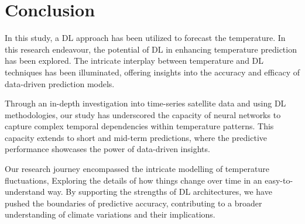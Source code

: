 \documentclass[sn-mathphys,Numbered]{sn-jnl}
\theoremstyle{thmstyleone}
\theoremstyle{thmstyletwo}
\theoremstyle{thmstylethree}
\begin{document}
\section{Conclusion}
In this study, a DL approach has been utilized to forecast the temperature. In this research endeavour, the potential of DL in enhancing temperature prediction has been explored. The intricate interplay between temperature and DL techniques has been illuminated, offering insights into the accuracy and efficacy of data-driven prediction models.

Through an in-depth investigation into time-series satellite data and using DL methodologies, our study has underscored the capacity of neural networks to capture complex temporal dependencies within temperature patterns. This capacity extends to short and mid-term predictions, where the predictive performance showcases the power of data-driven insights.

Our research journey encompassed the intricate modelling of temperature fluctuations, Exploring the details of how things change over time in an easy-to-understand way. By supporting the strengths of DL architectures, we have pushed the boundaries of predictive accuracy, contributing to a broader understanding of climate variations and their implications.



\end{document}
